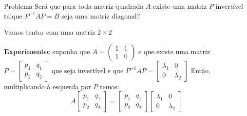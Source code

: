 \documentclass{beamer}
\begin{document}
\begin{frame}{Problema}
  Será que para toda matriz quadrada $A$ existe uma 
  matriz $P$ invertível talque $P^{-1}AP=B$ seja uma 
  matriz diagonal?
  
  Vamos tentar com uma matriz $2\times 2$

\textbf{Experimento:}
 suponha que $A= \begin{pmatrix}
   1 & 1 \\ 1 & 0
 \end{pmatrix}$ e que existe uma matriz $P=\begin{bmatrix}
   p_1 & q_1 \\ p_2 & q_2
 \end{bmatrix}$ que seja invertível e que 
 $P^{-1}AP = \begin{bmatrix}
   \lambda_1 & 0 \\ 0 & \lambda_2
 \end{bmatrix}$ Então, multiplicando à esquerda por $P$ temos:
 $$ A\begin{bmatrix}
  p_1 & q_1 \\ p_2 & q_2
\end{bmatrix} = \begin{bmatrix}
  p_1 & q_1 \\ p_2 & q_2
\end{bmatrix}\begin{bmatrix}
  \lambda_1 & 0 \\ 0 & \lambda_2
\end{bmatrix}$$
\end{frame}
\end{document}
